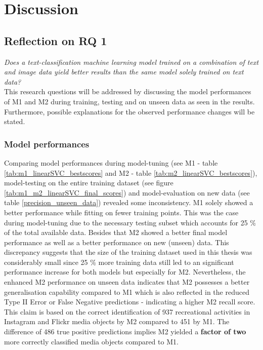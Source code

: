\chapter{Discussion} \label{discussion}

\section{Reflection on RQ 1}\label{discussion_rq1}

\textit{Does a text-classification machine learning model trained on a combination of text and image data yield better results than the same model solely trained on text data?}\\

This research questions will be addressed by discussing the model performances of M1 and M2 during training, testing and on unseen data as seen in the results. Furthermore, possible explanations for the observed performance changes will be stated.

\subsection{Model performances}

Comparing model performances during model-tuning (see M1 - table \ref{tab:m1_linearSVC_bestscores} and M2 - table \ref{tab:m2_linearSVC_bestscores}), model-testing on the entire training dataset (see figure \ref{tab:m1_m2_linearSVC_final_scores}) and model-evaluation on new data (see table \ref{precision_unseen_data}) revealed some inconsistency. M1 solely showed a better performance while fitting on fewer training points. This was the case during model-tuning due to the necessary testing subset which accounts for 25 \% of the total available data. Besides that M2 showed a better final model performance as well as a better performance on new (unseen) data. This discrepancy suggests that the size of the training dataset used in this thesis was considerably small since 25 \% more training data still led to an significant performance increase for both models but especially for M2. Nevertheless, the enhanced M2 performance on unseen data indicates that M2 possesses a better generalisation capability compared to M1 which is also reflected in the reduced Type II Error or False Negative predictions - indicating a higher M2 recall score. This claim is based on the correct identification of 937 recreational activities in Instagram and Flickr media objects by M2 compared to 451 by M1. The difference of 486 true positive predictions implies M2 yielded a \textbf{factor of two} more correctly classified media objects compared to M1.\\

